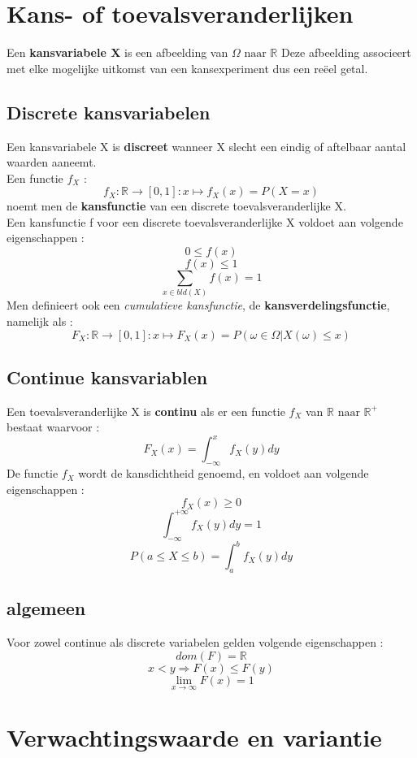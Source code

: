 \documentclass{report}
\begin{document}
  		\section{Kans- of toevalsveranderlijken}
  			Een \textbf{kansvariabele X} is een afbeelding van \(\Omega \textrm{ naar }\mathbb{R} \) Deze afbeelding associeert met elke mogelijke uitkomst van een kansexperiment dus een reëel getal.
	  		\subsection{Discrete kansvariabelen}
	  			Een kansvariabele X is \textbf{discreet} wanneer X slecht een eindig of aftelbaar aantal waarden aaneemt.
	  			\\
	  			Een functie \(f_X\) : 
	  			\[f_X : \mathbb{R} \rightarrow [0, 1] : x \longmapsto f_X(x) = P(X = x)\]
	  			noemt men de \textbf{kansfunctie} van een discrete toevalsveranderlijke X.
	  			\\ Een kansfunctie f voor een discrete toevalsveranderlijke X voldoet aan volgende eigenschappen : 
	  			\[0 \leq f(x)\]
	  			\[f(x) \leq 1\]
	  			\[\sum_{x\in bld(X)}f(x) = 1\]
	  			Men definieert ook een \textit{cumulatieve kansfunctie}, de \textbf{kansverdelingsfunctie}, namelijk als : 
	  			\[F_X : \mathbb{R} \rightarrow [0, 1] : x \longmapsto F_X(x) = P(\omega \in \Omega | X(\omega) \leq x) \]
	  		\subsection{Continue kansvariablen}
	  			Een toevalsveranderlijke X is \textbf{continu} als er een functie \(f_X\) van \(\mathbb{R} \textrm{ naar } \mathbb{R}^+\) bestaat waarvoor : 
	  			\[F_X(x) = \int_{-\infty}^xf_X(y)dy\]
	  			De functie \(f_X\) wordt de kansdichtheid genoemd, en voldoet aan volgende eigenschappen : 
	  			\[f_X(x) \geq 0\]
	  			\[\int_{-\infty}^{+\infty}f_X(y)dy = 1\]
	  			\[P(a \leq X \leq b)  = \int_{a}^{b}f_X(y)dy \]
	  		\subsection{algemeen}
	  			Voor zowel continue als discrete variabelen gelden volgende eigenschappen : 
	  			\[dom(F) = \mathbb{R}\]
	  			\[x < y \Rightarrow F(x) \leq F(y)\]
	  			\[\lim_{x \to \infty}F(x) = 1\]
	  	\section{Verwachtingswaarde en variantie}
\end{document}
